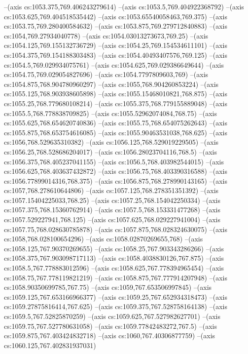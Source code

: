 --(axis cs:1053.375,769.406243279614)
--(axis cs:1053.5,769.404922368792)
--(axis cs:1053.625,769.404518535442)
--(axis cs:1053.65540058463,769.375)
--(axis cs:1053.75,769.280400584632)
--(axis cs:1053.875,769.279712840883)
--(axis cs:1054,769.27934040778)
--(axis cs:1054.03013273673,769.25)
--(axis cs:1054.125,769.155132736729)
--(axis cs:1054.25,769.154534611101)
--(axis cs:1054.375,769.154188303483)
--(axis cs:1054.40493407576,769.125)
--(axis cs:1054.5,769.029934075761)
--(axis cs:1054.625,769.029386649644)
--(axis cs:1054.75,769.029054827696)
--(axis cs:1054.7797809603,769)
--(axis cs:1054.875,768.904780960297)
--(axis cs:1055,768.904260853224)
--(axis cs:1055.125,768.903938605898)
--(axis cs:1055.15468010821,768.875)
--(axis cs:1055.25,768.779680108214)
--(axis cs:1055.375,768.779155889048)
--(axis cs:1055.5,768.778838709825)
--(axis cs:1055.52962074084,768.75)
--(axis cs:1055.625,768.654620740836)
--(axis cs:1055.75,768.654075262643)
--(axis cs:1055.875,768.653754616085)
--(axis cs:1055.90463531038,768.625)
--(axis cs:1056,768.529635310382)
--(axis cs:1056.125,768.529019229505)
--(axis cs:1056.25,768.528686204017)
--(axis cs:1056.28023704116,768.5)
--(axis cs:1056.375,768.405237041155)
--(axis cs:1056.5,768.403982544015)
--(axis cs:1056.625,768.403637432872)
--(axis cs:1056.75,768.403390316588)
--(axis cs:1056.77899014316,768.375)
--(axis cs:1056.875,768.278990143165)
--(axis cs:1057,768.278610644806)
--(axis cs:1057.125,768.278351351392)
--(axis cs:1057.15404225033,768.25)
--(axis cs:1057.25,768.154042250334)
--(axis cs:1057.375,768.15360762914)
--(axis cs:1057.5,768.153331477268)
--(axis cs:1057.529227941,768.125)
--(axis cs:1057.625,768.029227941004)
--(axis cs:1057.75,768.028630785878)
--(axis cs:1057.875,768.028324630075)
--(axis cs:1058,768.028100654296)
--(axis cs:1058.02870269655,768)
--(axis cs:1058.125,767.90370269655)
--(axis cs:1058.25,767.903343286266)
--(axis cs:1058.375,767.903098717113)
--(axis cs:1058.4038830126,767.875)
--(axis cs:1058.5,767.778883012596)
--(axis cs:1058.625,767.778394965454)
--(axis cs:1058.75,767.778119821219)
--(axis cs:1058.875,767.777914207948)
--(axis cs:1058.90350699785,767.75)
--(axis cs:1059,767.653506997845)
--(axis cs:1059.125,767.653166966377)
--(axis cs:1059.25,767.652934318473)
--(axis cs:1059.27875816414,767.625)
--(axis cs:1059.375,767.528758164138)
--(axis cs:1059.5,767.52825870259)
--(axis cs:1059.625,767.527982627701)
--(axis cs:1059.75,767.527780631058)
--(axis cs:1059.77842483272,767.5)
--(axis cs:1059.875,767.403424832718)
--(axis cs:1060,767.40306877759)
--(axis cs:1060.125,767.402831937031)
